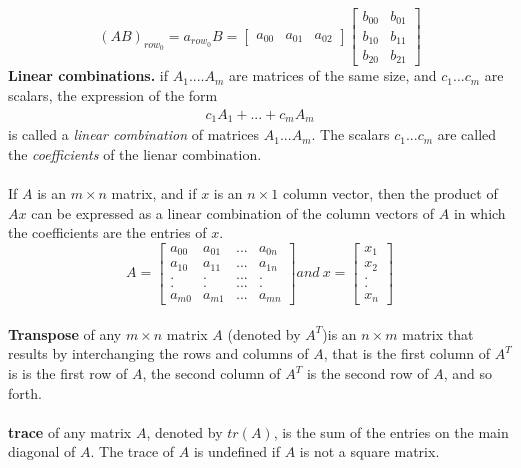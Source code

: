 \documentclass[a4paper, 12pt]{article}
\begin{document}
\[
(AB)_{row_0} = a_{row_0}B  = 
\left[
{
    \begin{array}{ccc}
    a_{00} &  a_{01} &  a_{02}
    \end{array}
}
\right]
\left[
{
    \begin{array}{cc}
        b_{00} &  b_{01} \\
        b_{10} &  b_{11} \\
        b_{20} &  b_{21} 
    \end{array}
}
\right]
\]
\textbf{Linear combinations.}
if $A_1....A_m$ are matrices of the same size, and $c_1...c_m$ are scalars, the expression
of the form
\begin{align*}
c_1A_1+...+c_mA_m
\end{align*}
is called a \textit{linear combination} of matrices $A_1...A_m$. The scalars $c_1...c_m$
 are called the \textit{coefficients} of the lienar combination.
\\
\\
If $A$ is an $m \times n$ matrix, and if $x$ is an $n \times 1$ column vector, 
then the product of $Ax$ can be expressed as a linear combination of the column vectors
of $A$ in which the coefficients are the entries of $x$.
\[
A = \left[{
    \begin{array}{cccc}
    a_{00} & a_{01} & ... & a_{0n} \\
    a_{10} & a_{11} & ... & a_{1n} \\
    .      & .      & ... & .      \\
    .      & .      & ... & .      \\
    a_{m0} & a_{m1} & ... & a_{mn} 
    \end{array}
}
\right]
and\ x = \left[{
    \begin{array}{c}
    x_1 \\
    x_2 \\
    . \\
    . \\
    x_n 
    \end{array}
}
\right]
\] 
\\ 
\textbf{Transpose} of any $m \times n$ matrix $A$ (denoted by $A^T$)is an $n \times m$ matrix that
results by interchanging the rows and columns of $A$, that is the first column of $A^T$ is is the first row
of $A$, the second column of $A^T$ is the second row of $A$, and so forth.
\\
\\
\textbf{trace} of any matrix $A$, denoted by $tr(A)$, is the sum of the entries on the main diagonal
of $A$. The trace of $A$ is undefined if $A$ is not a square matrix.
\end{document}

